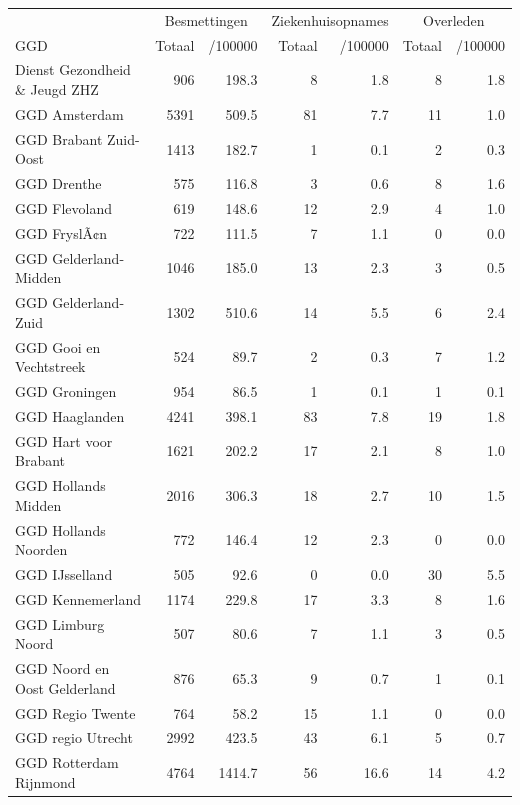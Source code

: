 \documentclass[
  english,
  man,floatsintext]{apa6}
\begin{document}
\begin{table}[H]
\centering\begingroup\fontsize{10}{12}\selectfont

\begin{threeparttable}
\begin{tabular}{lrrrrrr}
\toprule
\multicolumn{1}{c}{ } & \multicolumn{2}{c}{Besmettingen} & \multicolumn{2}{c}{Ziekenhuisopnames} & \multicolumn{2}{c}{Overleden} \\
\cmidrule(l{3pt}r{3pt}){2-3} \cmidrule(l{3pt}r{3pt}){4-5} \cmidrule(l{3pt}r{3pt}){6-7}
GGD & Totaal & /100000 & Totaal & /100000 & Totaal & /100000\\
\midrule
Dienst Gezondheid \& Jeugd ZHZ & 906 & 198.3 & 8 & 1.8 & 8 & 1.8\\
GGD Amsterdam & 5391 & 509.5 & 81 & 7.7 & 11 & 1.0\\
GGD Brabant Zuid-Oost & 1413 & 182.7 & 1 & 0.1 & 2 & 0.3\\
GGD Drenthe & 575 & 116.8 & 3 & 0.6 & 8 & 1.6\\
GGD Flevoland & 619 & 148.6 & 12 & 2.9 & 4 & 1.0\\
GGD FryslÃ¢n & 722 & 111.5 & 7 & 1.1 & 0 & 0.0\\
GGD Gelderland-Midden & 1046 & 185.0 & 13 & 2.3 & 3 & 0.5\\
GGD Gelderland-Zuid & 1302 & 510.6 & 14 & 5.5 & 6 & 2.4\\
GGD Gooi en Vechtstreek & 524 & 89.7 & 2 & 0.3 & 7 & 1.2\\
GGD Groningen & 954 & 86.5 & 1 & 0.1 & 1 & 0.1\\
GGD Haaglanden & 4241 & 398.1 & 83 & 7.8 & 19 & 1.8\\
GGD Hart voor Brabant & 1621 & 202.2 & 17 & 2.1 & 8 & 1.0\\
GGD Hollands Midden & 2016 & 306.3 & 18 & 2.7 & 10 & 1.5\\
GGD Hollands Noorden & 772 & 146.4 & 12 & 2.3 & 0 & 0.0\\
GGD IJsselland & 505 & 92.6 & 0 & 0.0 & 30 & 5.5\\
GGD Kennemerland & 1174 & 229.8 & 17 & 3.3 & 8 & 1.6\\
GGD Limburg Noord & 507 & 80.6 & 7 & 1.1 & 3 & 0.5\\
GGD Noord en Oost Gelderland & 876 & 65.3 & 9 & 0.7 & 1 & 0.1\\
GGD Regio Twente & 764 & 58.2 & 15 & 1.1 & 0 & 0.0\\
GGD regio Utrecht & 2992 & 423.5 & 43 & 6.1 & 5 & 0.7\\
GGD Rotterdam Rijnmond & 4764 & 1414.7 & 56 & 16.6 & 14 & 4.2\\

\end{tabular}
\end{threeparttable}
\end{table}
\end{document}
